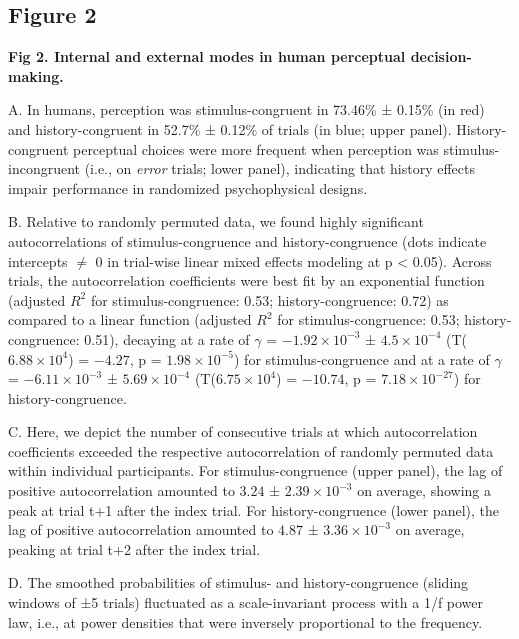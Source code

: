 \documentclass[
]{article}
\begin{document}
\newpage

\hypertarget{figure-2}{%
\subsection{Figure 2}\label{figure-2}}


\textbf{Fig 2. Internal and external modes in human perceptual
decision-making.}

A. In humans, perception was stimulus-congruent in 73.46\% ± 0.15\% (in
red) and history-congruent in 52.7\% ± 0.12\% of trials (in blue; upper
panel). History-congruent perceptual choices were more frequent when
perception was stimulus-incongruent (i.e., on \emph{error} trials; lower
panel), indicating that history effects impair performance in randomized
psychophysical designs.

B. Relative to randomly permuted data, we found highly significant
autocorrelations of stimulus-congruence and history-congruence (dots
indicate intercepts \(\neq\) 0 in trial-wise linear mixed effects
modeling at p \textless{} 0.05). Across trials, the autocorrelation
coefficients were best fit by an exponential function (adjusted \(R^2\)
for stimulus-congruence: 0.53; history-congruence: 0.72) as compared to
a linear function (adjusted \(R^2\) for stimulus-congruence: 0.53;
history-congruence: 0.51), decaying at a rate of \(\gamma\) =
\(\ensuremath{-1.92\times 10^{-3}}\) ±
\(\ensuremath{4.5\times 10^{-4}}\)
(T(\(\ensuremath{6.88\times 10^{4}}\)) = \(-4.27\), p =
\(\ensuremath{1.98\times 10^{-5}}\)) for stimulus-congruence and at a
rate of \(\gamma\) = \(\ensuremath{-6.11\times 10^{-3}}\) ±
\(\ensuremath{5.69\times 10^{-4}}\)
(T(\(\ensuremath{6.75\times 10^{4}}\)) = \(-10.74\), p =
\(\ensuremath{7.18\times 10^{-27}}\)) for history-congruence.

C. Here, we depict the number of consecutive trials at which
autocorrelation coefficients exceeded the respective autocorrelation of
randomly permuted data within individual participants. For
stimulus-congruence (upper panel), the lag of positive autocorrelation
amounted to \(3.24\) ± \(\ensuremath{2.39\times 10^{-3}}\) on average,
showing a peak at trial t+1 after the index trial. For
history-congruence (lower panel), the lag of positive autocorrelation
amounted to \(4.87\) ± \(\ensuremath{3.36\times 10^{-3}}\) on average,
peaking at trial t+2 after the index trial.

D. The smoothed probabilities of stimulus- and history-congruence
(sliding windows of ±5 trials) fluctuated as a scale-invariant process
with a 1/f power law, i.e., at power densities that were inversely
proportional to the frequency.
\end{document}
